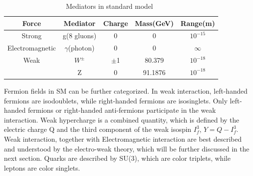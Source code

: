 \begin{table}[htp]
\caption{Mediators in standard model~\cite{Griffiths:111880}}
\begin{center}
\begin{tabular}{|c|c|c|c|c|}
\hline
Force & Mediator & Charge & Mass(GeV) & Range(m)   \\\hline
Strong                & g(8 gluons)                  & 0 & 0 & $10^{-15}$   \\\hline
Electromagnetic & $\gamma$(photon)     & 0 & 0 &   $\infty$   \\\hline
Weak                  &  $W^{\pm}$                &$\pm$1 & 80.379 &$10^{-18}$\\
                           & Z                                &  0         & 91.1876 &  $10^{-18}$ \\\hline
\end{tabular}
\end{center}
\label{Mediator_infor}
\end{table}%


Fermion fields in SM can be further categorized. In weak interaction, left-handed fermions are isodoublets, while right-handed fermions are isosinglets. Only left-handed fermions or right-handed anti-fermions participate in the weak interaction. Weak hypercharge is a combined quantity, which is defined by the electric charge Q and the third component of the weak isospin $I^{3}_{f}$, $Y=Q-I^{3}_{f}$. Weak interaction, together with Electromagnetic interaction are best described and understood by the electro-weak theory, which will be further discussed in the next section.  Quarks are described by SU(3), which are color triplets, while leptons are color singlets.   

